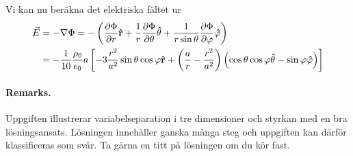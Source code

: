 \documentclass[%
oneside,                 %
final,                   %
10pt]{article}
\newenvironment{doconceexercise}{}{}
\begin{document}
\begin{doconceexercise}
Vi kan nu beräkna det elektriska fältet ur
\begin{align}
  \vec{E} &= - \nabla \Phi = - \left(\frac{\partial \Phi}{\partial r} 
{\bf \hat r} + \frac{1}{r} \frac{\partial \Phi}{\partial \theta} 
{\bf \hat \theta} + \frac{1}{r \sin \theta} 
\frac{\partial \Phi}{\partial \varphi} {\bf \hat \varphi}\right)
\nonumber \\
&= - \frac{1}{10}\frac{\rho_0}{\epsilon_0} a \left[-3 \frac{r^2}{a^2} \sin \theta
\cos \varphi {\bf \hat r} + \left(\frac{a}{r} - \frac{r^2}{a^2}\right) \left(
\cos \theta \cos \varphi {\bf \hat \theta} - \sin \varphi {\bf \hat \varphi}
\right) \right]
\end{align}



\paragraph{Remarks.}
Uppgiften illustrerar variabelseparation i tre dimensioner och styrkan med en bra lösningsansats. Lösningen innehåller ganska många steg och uppgiften kan därför klassificeras som svår. Ta gärna en titt på lösningen om du kör fast.


\end{doconceexercise}



\end{document}
